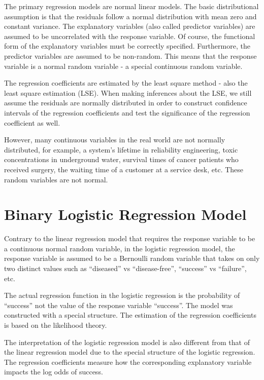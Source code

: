\documentclass[
]{book}
\begin{document}
The primary regression models are normal linear models. The basic distributional assumption is that the residuals follow a normal distribution with mean zero and constant variance. The explanatory variables (also called predictor variables) are assumed to be uncorrelated with the response variable. Of course, the functional form of the explanatory variables must be correctly specified. Furthermore, the predictor variables are assumed to be non-random. This means that the response variable is a normal random variable - a special continuous random variable.

The regression coefficients are estimated by the least square method - also the least square estimation (LSE). When making inferences about the LSE, we still assume the residuals are normally distributed in order to construct confidence intervals of the regression coefficients and test the significance of the regression coefficient as well.

However, many continuous variables in the real world are not normally distributed, for example, a system's lifetime in reliability engineering, toxic concentrations in underground water, survival times of cancer patients who received surgery, the waiting time of a customer at a service desk, etc. These random variables are not normal.

\hypertarget{binary-logistic-regression-model}{%
\section{Binary Logistic Regression Model}\label{binary-logistic-regression-model}}

Contrary to the linear regression model that requires the response variable to be a continuous normal random variable, in the logistic regression model, the response variable is assumed to be a Bernoulli random variable that takes on only two distinct values such as ``diseased'' vs ``disease-free'', ``success'' vs ``failure'', etc.

The actual regression function in the logistic regression is the probability of ``success'' not the value of the response variable ``success''. The model was constructed with a special structure. The estimation of the regression coefficients is based on the likelihood theory.

The interpretation of the logistic regression model is also different from that of the linear regression model due to the special structure of the logistic regression. The regression coefficients measure how the corresponding explanatory variable impacts the log odds of success.
\end{document}
